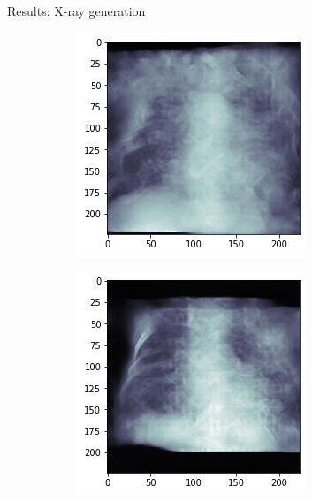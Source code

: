 \begin{frame}{Results: X-ray generation}
\begin{figure}[htbp!]
     \centering
     \begin{subfigure}[b]{0.3\textwidth}
         \centering
         \includegraphics[width=\textwidth]{Images/xray_sample1.png}
     \end{subfigure} 
     \hfill
     \begin{subfigure}[b]{0.3\textwidth}
         \centering
         \includegraphics[width=\textwidth]{Images/xray_sample2.png}

\end{subfigure}
\end{figure}
\end{frame}
